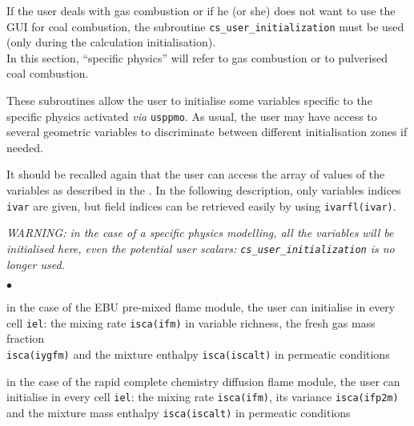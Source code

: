 {{{If the user deals with gas combustion or if he (or she) does not want to use the
GUI for coal combustion, the subroutine \texttt{cs\_user\_initialization} must be used (only during the calculation initialisation).\\
In this section, ``specific physics'' will refer to gas combustion or
to pulverised coal combustion.

These subroutines allow the user to initialise some variables specific
to the specific physics activated {\em via} \texttt{usppmo}. As usual,
the user may have access to several geometric variables to discriminate
between different initialisation zones if needed.

It should be recalled again that the user can access the array of values of the
variables as described in the . In the following description,
only variables indices \texttt{ivar} are given, but field indices can be
retrieved easily by using \texttt{ivarfl(ivar)}.

{\em WARNING: in the case of a specific physics modelling, all the
variables will be initialised here, even the potential user scalars: {\em
\texttt{cs\_user\_initialization}} is no longer used.}


\begin{list}{$\bullet$}{}
       \item in the case of the EBU pre-mixed flame module, the user can
             initialise in every cell \texttt{iel}: the mixing rate
             \texttt{isca(ifm)} in variable richness, the
             fresh gas mass fraction \\
             \texttt{isca(iygfm)}
             and the mixture enthalpy \texttt{isca(iscalt)} in
             permeatic conditions

        \item in the case of the rapid complete chemistry diffusion flame
             module, the user can initialise in every cell \texttt{iel}: the
             mixing rate \texttt{isca(ifm)}, its variance
             \texttt{isca(ifp2m)} and the mixture mass
             enthalpy \texttt{isca(iscalt)} in permeatic conditions


\end{list}}}}
